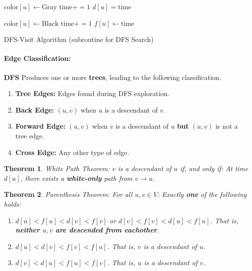 \documentclass[a4paper,12pt]{report}
\newtheorem{theorem}{Theorem}
\begin{document}
\begin{algorithm}[H]
\SetAlgoLined
{}
	\BlankLine
	\BlankLine
	$\text{color}[u] \leftarrow \text{Gray}$\;
	$\text{time} += 1$\;
	$d[u] = \text{time}$\;

	
	$\text{color}[u] \leftarrow \text{Black}$\;
	$\text{time} += 1$\;
	$f[u] \leftarrow \text{time}$\;

	\caption{DFS-Visit Algorithm (subroutine for DFS Search)}
\end{algorithm}


\paragraph{Edge Classification: } \textbf{DFS} Produces one or more \textbf{trees}, leading to the following classification.
\begin{enumerate}
\item \textbf{Tree Edges: } Edges found during DFS exploration.
\item \textbf{Back Edge: } $(u,v)$ when $u$ is a descendant of $v$.
\item \textbf{Forward Edge: } $(u,v)$ when $v$ is a descendant of $u$ \textbf{but} $(u,v)$ is not a tree edge.
\item \textbf{Cross Edge: } Any other type of edge. 
\end{enumerate}


\begin{theorem}{White Path Theorem: }
$v$ is a descendant of $u$ if, and only if: At time $d[u]$, there exists a \textbf{white-only} path from $v\to u$.
\end{theorem}

\begin{theorem}{Parenthesis Theorem: }
For all $u, v\in V$: Exactly \textbf{one} of the following holds:
\begin{enumerate}
\item $d[u] < f[u] < d[v] < f[v]$ or $d[v] < f[v] < d[u] < f[u]$. That is, \textbf{neither $u, v$ are descended from eachother}.
\item $d[u]< d[v] < f[v] < f[u]$. That is, $v$ is a descendant of $u$.
\item $d[v] < d[u] < f[u] < f[v]$. That is, $u$ is a descendant of $v$.
\end{enumerate}
\end{theorem}
\end{document}

